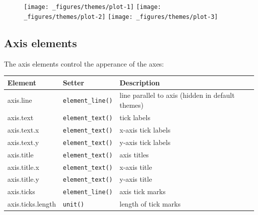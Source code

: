 \begin{Shaded}
\begin{Highlighting}[]
\StringTok{ }\NormalTok{(} \NormalTok{(} \NormalTok{, } \NormalTok{))}
\StringTok{ }\NormalTok{(}
   \NormalTok{(} \NormalTok{, } \NormalTok{),}
   \NormalTok{(}\NormalTok{, }\NormalTok{, }\NormalTok{, }\NormalTok{)}
\NormalTok{)}
\StringTok{ }\NormalTok{(} \NormalTok{(} \NormalTok{))}
\end{Highlighting}
\end{Shaded}

\begin{figure}[H]
  \texttt{[image: \_figures/themes/plot-1]}%
  \texttt{[image: \_figures/themes/plot-2]}%
  \texttt{[image: \_figures/themes/plot-3]}
\end{figure}

\subsection{Axis elements}\label{sub:theme-axis}

 

The axis elements control the apperance of the axes:

\begin{longtable}[c]{@{}lll@{}}
\toprule
Element & Setter & Description\tabularnewline
\midrule
\endhead
axis.line & \texttt{element\_line()} & line parallel to axis (hidden in
default themes)\tabularnewline
axis.text & \texttt{element\_text()} & tick labels\tabularnewline
axis.text.x & \texttt{element\_text()} & x-axis tick
labels\tabularnewline
axis.text.y & \texttt{element\_text()} & y-axis tick
labels\tabularnewline
axis.title & \texttt{element\_text()} & axis titles\tabularnewline
axis.title.x & \texttt{element\_text()} & x-axis title\tabularnewline
axis.title.y & \texttt{element\_text()} & y-axis title\tabularnewline
axis.ticks & \texttt{element\_line()} & axis tick marks\tabularnewline
axis.ticks.length & \texttt{unit()} & length of tick
marks\tabularnewline
\bottomrule
\end{longtable}

